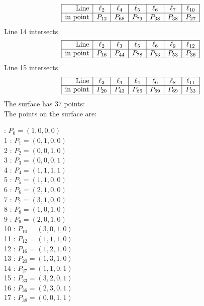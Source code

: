 \documentclass{article}
\begin{document}
{$$
\begin{array}{|r*{6}{|c}|}
\hline
\mbox{Line}  & \ell_{2} & \ell_{4} & \ell_{5} & \ell_{6} & \ell_{7} & \ell_{10}\\
\hline
\mbox{in point}  & P_{12} & P_{68} & P_{79} & P_{38} & P_{38} & P_{27}\\
\hline
\end{array}
$$
Line 14 intersects 
$$
\begin{array}{|r*{6}{|c}|}
\hline
\mbox{Line}  & \ell_{2} & \ell_{3} & \ell_{5} & \ell_{6} & \ell_{9} & \ell_{12}\\
\hline
\mbox{in point}  & P_{16} & P_{44} & P_{78} & P_{53} & P_{53} & P_{36}\\
\hline
\end{array}
$$
Line 15 intersects 
$$
\begin{array}{|r*{6}{|c}|}
\hline
\mbox{Line}  & \ell_{2} & \ell_{3} & \ell_{4} & \ell_{6} & \ell_{8} & \ell_{11}\\
\hline
\mbox{in point}  & P_{20} & P_{43} & P_{66} & P_{69} & P_{69} & P_{33}\\
\hline
\end{array}
$$
The surface has 37 points:\\
The points on the surface are:\\
\begin{multicols}{3}
 : $P_{0}=( 1, 0, 0, 0 )$\\
1 : $P_{1}=( 0, 1, 0, 0 )$\\
2 : $P_{2}=( 0, 0, 1, 0 )$\\
3 : $P_{3}=( 0, 0, 0, 1 )$\\
4 : $P_{4}=( 1, 1, 1, 1 )$\\
5 : $P_{5}=( 1, 1, 0, 0 )$\\
6 : $P_{6}=( 2, 1, 0, 0 )$\\
7 : $P_{7}=( 3, 1, 0, 0 )$\\
8 : $P_{8}=( 1, 0, 1, 0 )$\\
9 : $P_{9}=( 2, 0, 1, 0 )$\\
10 : $P_{10}=( 3, 0, 1, 0 )$\\
11 : $P_{12}=( 1, 1, 1, 0 )$\\
12 : $P_{16}=( 1, 2, 1, 0 )$\\
13 : $P_{20}=( 1, 3, 1, 0 )$\\
14 : $P_{27}=( 1, 1, 0, 1 )$\\
15 : $P_{33}=( 3, 2, 0, 1 )$\\
16 : $P_{36}=( 2, 3, 0, 1 )$\\
17 : $P_{38}=( 0, 0, 1, 1 )$\\

\end{multicols}}
\end{document}
